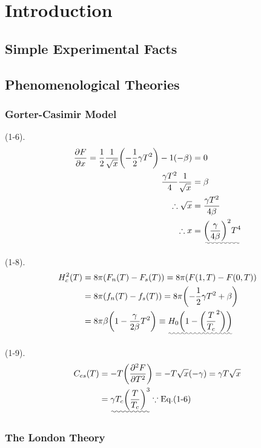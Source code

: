 \chapter{Introduction} %
\label{cha:Introduction}

\section{Simple Experimental Facts} %
\label{sec:Simple Experimental Facts}

\section{Phenomenological Theories} %
\label{sec:Phenomenological Theories}
\subsection{Gorter-Casimir Model} %
\label{sub:Gorter-Casimir Model}
(1-6). 
\begin{align}
    \pdv{F}{x} = \frac{1}{2}\frac{1}{\sqrt{x}}\qty(-\frac{1}{2}\gamma T^2)-1(-\beta) &= 0 \notag\\
    \frac{\gamma T^2}{4}\frac{1}{\sqrt{x}} &= \beta \notag\\
    \therefore\sqrt{x} &= \frac{\gamma T^2}{4\beta} \notag\\
    \therefore x &= \uwave{\qty(\frac{\gamma}{4\beta})^2T^4} \notag
\end{align}

(1-8). 
\begin{align}
    H_c^2(T) &= 8\pi(F_n(T)-F_s(T)) = 8\pi(F(1,T)-F(0,T)) \notag\\
    &= 8\pi(f_n(T)-f_s(T)) = 8\pi\qty(-\frac{1}{2}\gamma T^2+\beta) \notag\\
    &= 8\pi\beta\qty(1-\frac{\gamma}{2\beta}T^2) \equiv \uwave{H_0\qty(1-\qty(\frac{T}{T_c}^2))} \notag
\end{align}

(1-9). 
\begin{align}
    C_{es}(T) &= -T\qty(\pdv[2]{F}{T}) = -T\sqrt{x}(-\gamma) = \gamma T\sqrt{x} \notag\\
    &= \uwave{\gamma T_c\qty(\frac{T}{T_c})^3} \because \text{Eq.(1-6)} \notag
\end{align}

\subsection{The London Theory} %
\label{sub:The London Theory}

